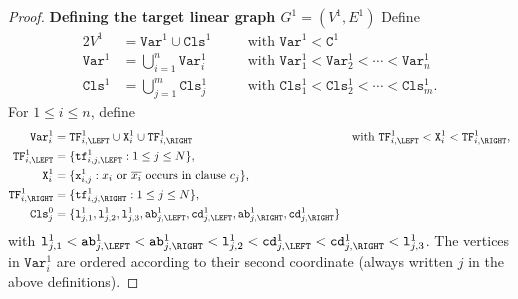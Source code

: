 \begin{proof}
  \medskip
  \textbf{Defining the target linear graph $G^{1} = (V^{1}, E^{1})$}
  \medskip
    Define
    \begin{alignat*} {2}
      V^{1} &= \texttt{Var}^{1} \cup \texttt{Cls}^{1}
      &\quad&\text{with $\texttt{Var}^{1} < \texttt{C}^{1}$}
      \\
      \texttt{Var}^{1} &= \bigcup_{i=1}^{n} \texttt{Var}^{1}_{i}
      &&\text{with $\texttt{Var}^{1}_1 < \texttt{Var}^{1}_2 < \cdots < \texttt{Var}^{1}_n$}
      \\
      \texttt{Cls}^{1} &= \bigcup_{j=1}^{m} \texttt{Cls}^{1}_{j}
      &&\text{with $\texttt{Cls}^{1}_1 < \texttt{Cls}^{1}_2 < \cdots < \texttt{Cls}^{1}_m$.}
    \end{alignat*}
    For $1 \leq i \leq n$, define
    \begin{alignat*}{2}
      \texttt{Var}^{1}_{i} &=
      \texttt{TF}^{1}_{i,\LEFT} \cup \texttt{X}^{1}_{i} \cup \texttt{TF}^{1}_{i,\RIGHT}
      &&\text{with $\texttt{TF}^{1}_{i,\LEFT} < \texttt{X}^{1}_{i} < \texttt{TF}^{1}_{i,\RIGHT}$},
      \\
      \texttt{TF}^{1}_{i,\LEFT}
      &=
      \{\texttt{tf}^{1}_{i,j,\LEFT} : 1 \leq j \leq N\},
      &&
      \\
      \texttt{X}^{1}_{i}
      &=
      \{\texttt{x}^{1}_{i,j} : \text{$x_{i}$ or $\overline{x_{i}}$ occurs in clause $c_{j}$}\},
      &&
      \\
      \texttt{TF}^{1}_{i,\RIGHT}
      &=
      \{\texttt{tf}^{1}_{i,j,\RIGHT} : 1 \leq j \leq N\},
      &&
      \\
      \texttt{Cls}^{0}_{j}
      &=
      \{
      \texttt{l}^{1}_{j,1},
      \texttt{l}^{1}_{j,2},
      \texttt{l}^{1}_{j,3},
      \texttt{ab}^{1}_{j,\LEFT},
      \texttt{cd}^{1}_{j,\LEFT},
      \texttt{ab}^{1}_{j,\RIGHT},
      \texttt{cd}^{1}_{j,\RIGHT}
      \}
      &&
    \end{alignat*}
    with
    $
    \texttt{l}^{1}_{j,1} <
    \texttt{ab}^{1}_{j,\LEFT} <
    \texttt{ab}^{1}_{j,\RIGHT} <
    \texttt{l}^{1}_{j,2} <
    \texttt{cd}^{1}_{j,\LEFT} <
    \texttt{cd}^{1}_{j,\RIGHT} <
    \texttt{l}^{1}_{j,3}
    $.
    The vertices in $\texttt{Var}^{1}_{i}$ are ordered according to their second coordinate
    (always written $j$ in the above definitions).


\end{proof}
